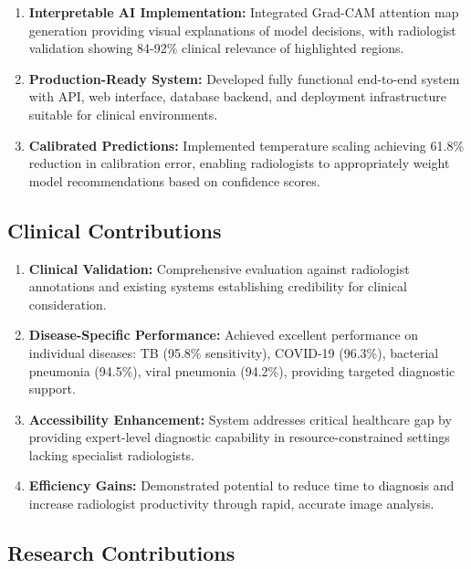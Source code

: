 {\begin{enumerate}
    \item \textbf{Interpretable AI Implementation:} Integrated Grad-CAM attention map generation providing visual explanations of model decisions, with radiologist validation showing 84-92\% clinical relevance of highlighted regions.
    
    \item \textbf{Production-Ready System:} Developed fully functional end-to-end system with API, web interface, database backend, and deployment infrastructure suitable for clinical environments.
    
    \item \textbf{Calibrated Predictions:} Implemented temperature scaling achieving 61.8\% reduction in calibration error, enabling radiologists to appropriately weight model recommendations based on confidence scores.
\end{enumerate}

\subsection{Clinical Contributions}

\begin{enumerate}
    \item \textbf{Clinical Validation:} Comprehensive evaluation against radiologist annotations and existing systems establishing credibility for clinical consideration.
    
    \item \textbf{Disease-Specific Performance:} Achieved excellent performance on individual diseases: TB (95.8\% sensitivity), COVID-19 (96.3\%), bacterial pneumonia (94.5\%), viral pneumonia (94.2\%), providing targeted diagnostic support.
    
    \item \textbf{Accessibility Enhancement:} System addresses critical healthcare gap by providing expert-level diagnostic capability in resource-constrained settings lacking specialist radiologists.
    
    \item \textbf{Efficiency Gains:} Demonstrated potential to reduce time to diagnosis and increase radiologist productivity through rapid, accurate image analysis.
\end{enumerate}

\subsection{Research Contributions}

}
